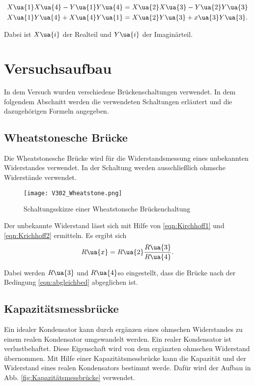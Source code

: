 \begin{align}
  X\ua{1}X\ua{4} - Y\ua{1}Y\ua{4} &= X\ua{2}X\ua{3} - Y\ua{2}Y\ua{3}\label{eqn:RealteilAbgleichbed}\\
  X\ua{1}Y\ua{4} + X\ua{4}Y\ua{1} &= X\ua{2}Y\ua{3} + x\ua{3}Y\ua{3}\label{enq:ImaginärteilAbgleichbed}.
\end{align}

Dabei ist $X\ua{i}$ der Realteil und $Y\ua{i}$ der Imaginärteil.

\section{Versuchsaufbau}

In dem Versuch wurden verschiedene Brückenschaltungen verwendet. In dem folgendem
Abschnitt werden die verwendeten Schaltungen erläutert und die dazugehörigen
Formeln angegeben.

\subsection{Wheatstonesche Brücke}

Die Wheatstonesche Brücke wird für die Widerstandsmessung eines unbekannten
Widerstandes verwendet. In der Schaltung werden ausschließlich ohmsche Widerstände
verwendet.

\FloatBarrier
\begin{figure}
  \texttt{[image: V302\_Wheatstone.png]}
  \caption{Schaltungsskizze einer Wheatstonsche Brückenchaltung\cite{anleitung01}}
  \label{fig:Wheatstone}
\end{figure}
\FloatBarrier

Der unbekannte Widerstand lässt sich mit Hilfe von \eqref{eqn:Kirchhoff1} und
\eqref{eqn:Krichhoff2} ermitteln. Es ergibt sich
\begin{equation}
  \label{eqn:Wheatstone}
  R\ua{x} = R\ua{2}\frac{R\ua{3}}{R\ua{4}}.
\end{equation}

Dabei werden $R\ua{3}$ und $R\ua{4}$so eingestellt, dass die Brücke nach
der Bedingung \eqref{eqn:abgleichbed} abgeglichen ist.

\subsection{Kapazitätsmessbrücke}

Ein idealer Kondensator kann durch ergänzen eines ohmschen Widerstandes zu einem
realen Kondensator umgewandelt werden. Ein realer Kondensator ist verlustbehaftet.
Diese Eigenschaft wird von dem ergänzten ohmschen Widerstand übernommen.
Mit Hilfe einer Kapazitätsmessbrücke kann die Kapazität und der Widerstand eines
realen Kondensators bestimmt werde.
Dafür wird der Aufbau in Abb. \ref{fig:Kapazitätsmessbrücke} verwendet.

